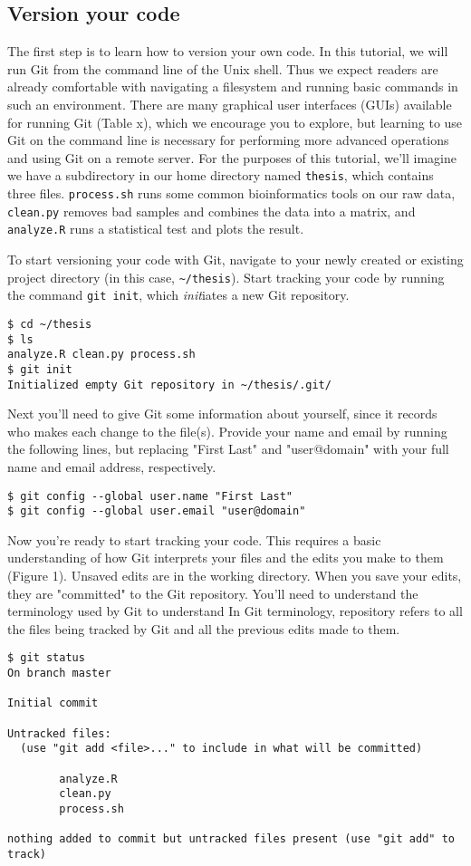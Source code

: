 \subsection{Version your code}

The first step is to learn how to version your own code. In this tutorial, we will run Git from the command line of the Unix shell. Thus we expect readers are already comfortable with navigating a filesystem and running basic commands in such an environment. There are many graphical user interfaces (GUIs) available for running Git (Table x), which we encourage you to explore, but learning to use Git on the command line is necessary for performing more advanced operations and using Git on a remote server. For the purposes of this tutorial, we'll imagine we have a subdirectory in our home directory named \verb|thesis|, which contains three files. \verb|process.sh| runs some common bioinformatics tools on our raw data, \verb|clean.py| removes bad samples and combines the data into a matrix, and \verb|analyze.R| runs a statistical test and plots the result.

To start versioning your code with Git, navigate to your newly created or existing project directory (in this case, \verb|~/thesis|).  Start tracking your code by running the command \verb|git init|, which \textit{init}iates a new Git repository.

\begin{lstlisting}
$ cd ~/thesis
$ ls
analyze.R clean.py process.sh
$ git init
Initialized empty Git repository in ~/thesis/.git/
\end{lstlisting}

Next you'll need to give Git some information about yourself, since it records who makes each change to the file(s). Provide your name and email by running the following lines, but replacing "First Last" and "user@domain" with your full name and email address, respectively.

\begin{lstlisting}
$ git config --global user.name "First Last"
$ git config --global user.email "user@domain"
\end{lstlisting}

Now you're ready to start tracking your code.
This requires a basic understanding of how Git interprets your files and the edits you make to them (Figure 1).
Unsaved edits are in the working directory.
When you save your edits, they are "committed" to the Git repository.
You'll need to understand the terminology used by Git to understand
In Git terminology, repository refers to all the files being tracked by Git and all the previous edits made to them.

\begin{lstlisting}
$ git status
On branch master

Initial commit

Untracked files:
  (use "git add <file>..." to include in what will be committed)

        analyze.R
        clean.py
        process.sh

nothing added to commit but untracked files present (use "git add" to track)
\end{lstlisting}